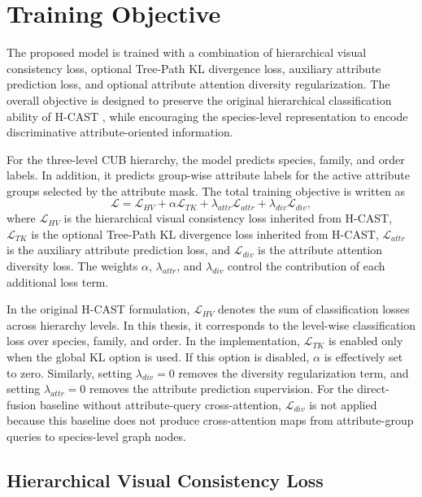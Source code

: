 \section{Training Objective}

The proposed model is trained with a combination of hierarchical visual consistency loss, optional Tree-Path KL divergence loss, auxiliary attribute prediction loss, and optional attribute attention diversity regularization. The overall objective is designed to preserve the original hierarchical classification ability of H-CAST \cite{park2025visually}, while encouraging the species-level representation to encode discriminative attribute-oriented information.

For the three-level CUB hierarchy, the model predicts species, family, and order labels. In addition, it predicts group-wise attribute labels for the active attribute groups selected by the attribute mask. The total training objective is written as
\begin{equation}
    \mathcal{L}
    =
    \mathcal{L}_{HV}
    +
    \alpha \mathcal{L}_{TK}
    +
    \lambda_{attr}\mathcal{L}_{attr}
    +
    \lambda_{div}\mathcal{L}_{div},
    \label{eq:total_loss}
\end{equation}
where \(\mathcal{L}_{HV}\) is the hierarchical visual consistency loss inherited from H-CAST, \(\mathcal{L}_{TK}\) is the optional Tree-Path KL divergence loss inherited from H-CAST, \(\mathcal{L}_{attr}\) is the auxiliary attribute prediction loss, and \(\mathcal{L}_{div}\) is the attribute attention diversity loss. The weights \(\alpha\), \(\lambda_{attr}\), and \(\lambda_{div}\) control the contribution of each additional loss term.

In the original H-CAST formulation, \(\mathcal{L}_{HV}\) denotes the sum of classification losses across hierarchy levels. In this thesis, it corresponds to the level-wise classification loss over species, family, and order. In the implementation, \(\mathcal{L}_{TK}\) is enabled only when the global KL option is used. If this option is disabled, \(\alpha\) is effectively set to zero. Similarly, setting \(\lambda_{div}=0\) removes the diversity regularization term, and setting \(\lambda_{attr}=0\) removes the attribute prediction supervision.
For the direct-fusion baseline without attribute-query cross-attention, \(\mathcal{L}_{div}\) is not applied because this baseline does not produce cross-attention maps from attribute-group queries to species-level graph nodes.

\subsection{Hierarchical Visual Consistency Loss}

